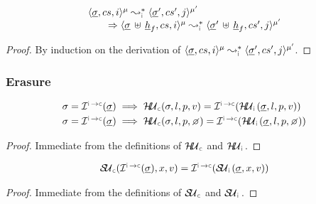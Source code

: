 \begin{temax}
$$
\begin{array}{l} 
\transabssemrule{\istate, \cs, i}{\istate', \cs', j}{\mode}{\mode'}{\instrumented} \\ \quad \quad 
   \Rightarrow \transabssemrule{\istate \dunion \iheap_f, \cs, i}{\istate' \dunion \iheap_f, \cs', j}{\mode}{\mode'}{\instrumented} 
 \end{array}
$$
\end{temax}
\begin{proof}
By induction on the derivation of $\transabssemrule{\istate, \cs, i}{\istate', \cs', j}{\mode}{\mode'}{\instrumented}$. 
\end{proof}



\subsubsection{Erasure}

\begin{lemma}\label{lemma:erasure:heap:update}
$$
\begin{array}{l}
\jstate = \interpret{\instconc}{}(\istate)  
   \implies \hpupdt{\concrete}(\jstate, \loc, p, \val) = \interpret{\instconc}{}(\hpupdt{\instrumented}(\istate, \loc, p, \val)) \\[3pt]
%       
\jstate = \interpret{\instconc}{}(\istate)
  \implies \hpupdt{\concrete}(\jstate, \loc, p, \none) = \interpret{\instconc}{}(\hpupdt{\instrumented}(\istate, \loc, p, \none)) 
\end{array}
$$
\end{lemma}
\begin{proof}
Immediate from the definitions of $\hpupdt{\concrete}$ and $\hpupdt{\instrumented}$.
\end{proof}


\begin{lemma}\label{lemma:erasure:store:update}
$$
\begin{array}{l}
 \stupdt{\concrete}(\interpret{\instconc}{}(\istate), \jvar, \val) = \interpret{\instconc}{}(\stupdt{\instrumented}(\istate, \jvar, \val)) 
\end{array}
$$
\end{lemma}
\begin{proof}
Immediate from the definitions of $\stupdt{\concrete}$ and $\stupdt{\instrumented}$.
\end{proof}

